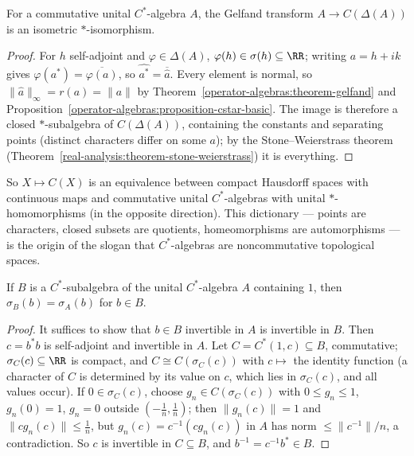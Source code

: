 \begin{theorem}\label{operator-algebras:theorem-commutative-gelfand-naimark}
For a commutative unital $C^*$-algebra $A$, the Gelfand transform $A \to C(\Delta(A))$ is an isometric $*$-isomorphism.
\end{theorem}

\begin{proof}
For $h$ self-adjoint and $\varphi \in \Delta(A)$, $\varphi(h) \in \sigma(h) \subseteq \RR$; writing $a = h + ik$ gives $\varphi(a^*) = \overline{\varphi(a)}$, so $\widehat{a^*} = \overline{\hat a}$. Every element is normal, so
$\|\hat a\|_\infty = r(a) = \|a\|$ by Theorem~\ref{operator-algebras:theorem-gelfand} and Proposition~\ref{operator-algebras:proposition-cstar-basic}. The image is therefore a closed $*$-subalgebra of $C(\Delta(A))$, containing the
constants and separating points (distinct characters differ on some $a$); by the Stone--Weierstrass theorem (Theorem~\ref{real-analysis:theorem-stone-weierstrass}) it is everything.
\end{proof}

So $X \mapsto C(X)$ is an equivalence between compact Hausdorff spaces with continuous maps and commutative unital $C^*$-algebras with unital $*$-homomorphisms (in the opposite direction). This dictionary --- points
are characters, closed subsets are quotients, homeomorphisms are automorphisms --- is the origin of the slogan that $C^*$-algebras are noncommutative topological spaces.

\begin{theorem}\label{operator-algebras:theorem-spectral-permanence}
If $B$ is a $C^*$-subalgebra of the unital $C^*$-algebra $A$ containing $1$, then $\sigma_B(b) = \sigma_A(b)$ for $b \in B$.
\end{theorem}

\begin{proof}
It suffices to show that $b \in B$ invertible in $A$ is invertible in $B$. Then $c = b^*b$ is self-adjoint and invertible in $A$. Let $C = C^*(1, c) \subseteq B$, commutative; $\sigma_C(c) \subseteq \RR$ is compact, and
$C \cong C(\sigma_C(c))$ with $c \mapsto$ the identity function (a character of $C$ is determined by its value on $c$, which lies in $\sigma_C(c)$, and all values occur). If $0 \in \sigma_C(c)$, choose $g_n \in C(\sigma_C(c))$
with $0 \leq g_n \leq 1$, $g_n(0) = 1$, $g_n = 0$ outside $(-\frac1n, \frac1n)$; then $\|g_n(c)\| = 1$ and $\|cg_n(c)\| \leq \frac1n$, but $g_n(c) = c^{-1}(cg_n(c))$ in $A$ has norm $\leq \|c^{-1}\|/n$, a contradiction. So $c$ is
invertible in $C \subseteq B$, and $b^{-1} = c^{-1}b^* \in B$.
\end{proof}

